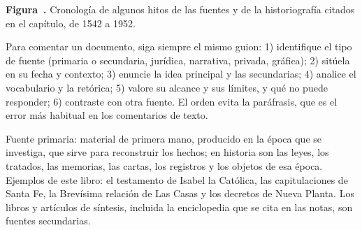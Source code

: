 \documentclass{book}
\newcounter{studiumfigure}
\begin{document}
\begin{minipage}{\linewidth}
%
\fi
\fi
\endgroup
\par\nopagebreak
{\small {}\label{fig:historiografia-cronologia}\textbf{Figura~\thestudiumfigure.} Cronología de algunos hitos de las fuentes y de la historiografía citados en el capítulo, de 1542 a 1952.\par}
\end{minipage}
\par\vspace{\baselineskip}

\begin{tcolorbox}[title={Consejo}, studiumtip, breakable]

Para comentar un documento, siga siempre el mismo guion: 1) identifique el tipo de fuente (primaria o secundaria, jurídica, narrativa, privada, gráfica); 2) sitúela en su fecha y contexto; 3) enuncie la idea principal y las secundarias; 4) analice el vocabulario y la retórica; 5) valore su alcance y sus límites, y qué no puede responder; 6) contraste con otra fuente. El orden evita la paráfrasis, que es el error más habitual en los comentarios de texto.

\end{tcolorbox}

\begin{tcolorbox}[title={Definición}, studiumdef, breakable]

Fuente primaria: material de primera mano, producido en la época que se investiga, que sirve para reconstruir los hechos; en historia son las leyes, los tratados, las memorias, las cartas, los registros y los objetos de esa época. Ejemplos de este libro: el testamento de Isabel la Católica, las capitulaciones de Santa Fe, la Brevísima relación de Las Casas y los decretos de Nueva Planta. Los libros y artículos de síntesis, incluida la enciclopedia que se cita en las notas, son fuentes secundarias.

\end{tcolorbox}
\end{document}

